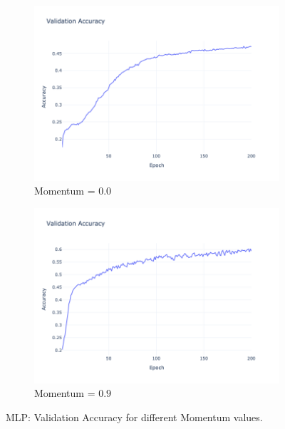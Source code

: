 \begin{figure}[htbp!]
    \centering
    \begin{subfigure}{0.45\textwidth}
        \centering
        \includegraphics[width=\textwidth]{images/mlp-validation-accuracy-batch-1024-lr-0.002-epochs-200-hidden-200-dropout-0.3-l2-0.0-layers-2-act-relu-opt-sgd-mom-0.0.png}
        \caption{Momentum = $0.0$}
    \end{subfigure}
    \begin{subfigure}{0.45\textwidth}
        \centering
        \includegraphics[width=\textwidth]{images/mlp-validation-accuracy-batch-1024-lr-0.002-epochs-200-hidden-200-dropout-0.3-l2-0.0-layers-2-act-relu-opt-sgd-mom-0.9.png}
        \caption{Momentum = $0.9$}
    \end{subfigure}
    \caption{MLP: Validation Accuracy for different Momentum values.}
    \label{fig:mlp_momentum_acc}
\end{figure}
